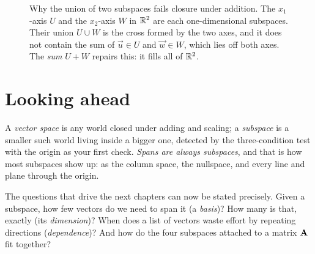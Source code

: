 \begin{figure}[htbp]
\centering
{}
\caption{Why the union of two subspaces fails closure under addition. The $x_1$-axis $U$
and the $x_2$-axis $W$ in $\mathbb{R}^2$ are each one-dimensional subspaces. Their
union $U \cup W$ is the cross formed by the two axes, and it does not contain the sum of
$\vec{u} \in U$ and $\vec{w} \in W$, which lies off both axes.
The \emph{sum} $U+W$ repairs this: it fills all of $\mathbb{R}^2$.}
\label{ch11:fig-union-fail}
\end{figure}

\section{Looking ahead}

A \emph{vector space} is any world closed under
adding and scaling; a \emph{subspace} is a smaller such world living inside a bigger one,
detected by the three-condition test with the origin as your first check. \emph{Spans are
always subspaces}, and that is how most subspaces show up: as the column space, the
nullspace, and every line and plane through the origin.

The questions that drive the next chapters can now be stated precisely. Given a
subspace, how few vectors do we need to span it (a \emph{basis})? How many is that, exactly
(its \emph{dimension})? When does a list of vectors waste effort by repeating directions
(\emph{dependence})? And how do the four subspaces attached to a matrix $\mathbf{A}$ fit
together?

